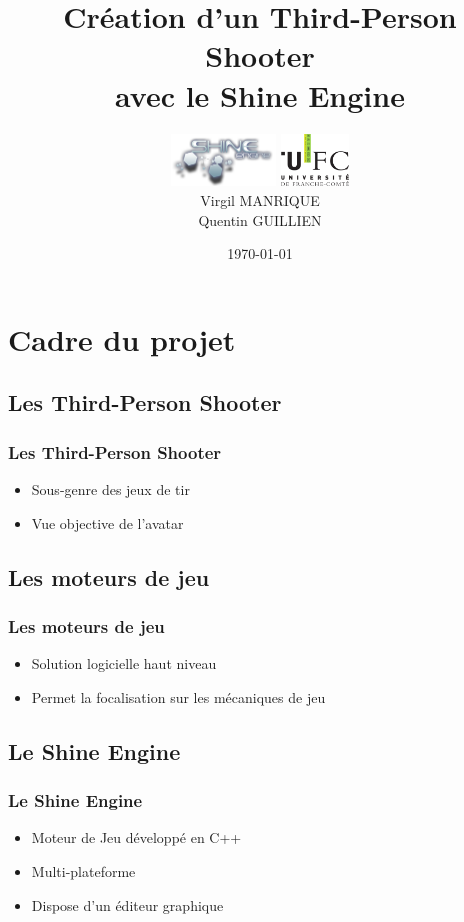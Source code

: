 \documentclass[12pt,handout]{beamer}
\title[Création d’un TPS avec le Shine Engine]{Création d’un Third-Person Shooter\\ avec le Shine Engine}
\author[Virgil MANRIQUE \hspace{2mm} Quentin GUILLIEN]{%
\includegraphics[height=14mm]{logo_shine.png} \hspace{20mm} \includegraphics[height=14mm]{logo-ufc.png}\\\vspace{4mm}
Virgil MANRIQUE \\ Quentin GUILLIEN}
\date{\today}
\begin{document}
\begin{frame}
\titlepage

\end{frame}





\section{Cadre du projet}

\subsection{Les Third-Person Shooter}
\begin{frame}
\frametitle{Les Third-Person Shooter}

\begin{itemize}
\item
Sous-genre des jeux de tir
\item
Vue objective de l'avatar
\end{itemize}

\end{frame}

\subsection{Les moteurs de jeu}
\begin{frame}
\frametitle{Les moteurs de jeu}

\begin{itemize}
\item
Solution logicielle haut niveau
\item
Permet la focalisation sur les mécaniques de jeu
\end{itemize}
\end{frame}

\subsection{Le Shine Engine}
\begin{frame}
\frametitle{Le Shine Engine}
\begin{itemize}
\item
Moteur de Jeu développé en C++
\item
Multi-plateforme 
\item
Dispose d'un éditeur graphique

\end{itemize}

\end{frame}
\end{document}
